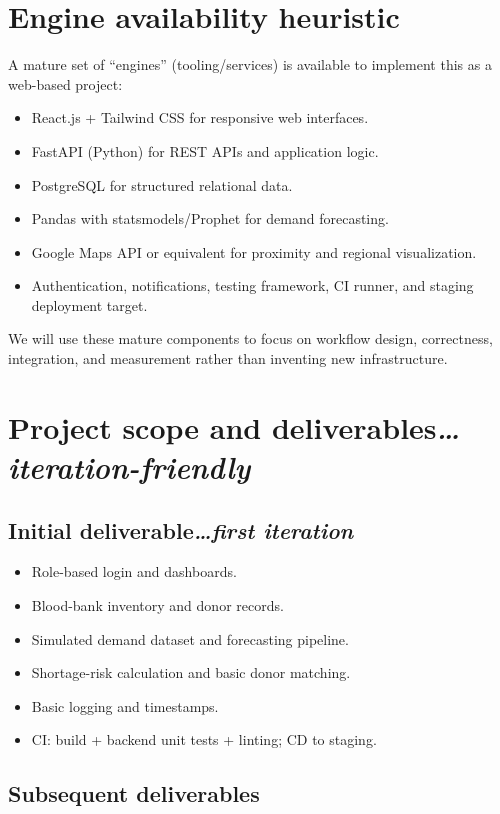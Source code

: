 \documentclass[11pt]{article}
\newcommand{\secnote}[2]{\section{#1\hfill\normalfont\normalsize\itshape #2}}
\newcommand{\subsecnote}[2]{\subsection{#1\hfill\normalfont\normalsize\itshape #2}}
\begin{document}
\section{Engine availability heuristic}

A mature set of ``engines'' (tooling/services) is available to implement this as a web-based
project:

\begin{itemize}
\item React.js + Tailwind CSS for responsive web interfaces.
\item FastAPI (Python) for REST APIs and application logic.
\item PostgreSQL for structured relational data.
\item Pandas with statsmodels/Prophet for demand forecasting.
\item Google Maps API or equivalent for proximity and regional visualization.
\item Authentication, notifications, testing framework, CI runner, and staging deployment target.
\end{itemize}

We will use these mature components to focus on workflow design, correctness, integration, and
measurement rather than inventing new infrastructure.

\secnote{Project scope and deliverables}{\ldots iteration-friendly}

\subsecnote{Initial deliverable}{\ldots first iteration}

\begin{itemize}
\item Role-based login and dashboards.
\item Blood-bank inventory and donor records.
\item Simulated demand dataset and forecasting pipeline.
\item Shortage-risk calculation and basic donor matching.
\item Basic logging and timestamps.
\item CI: build + backend unit tests + linting; CD to staging.
\end{itemize}

\subsection{Subsequent deliverables}
\end{document}

